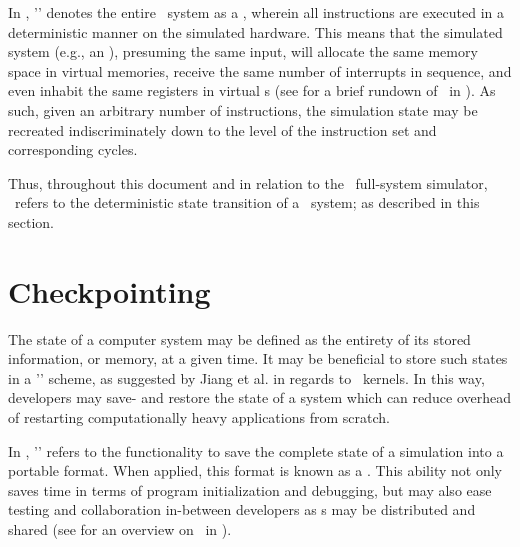 In \dvttermsimics , '\dvttermdeterministicexecution ' denotes the entire \dvttermtarget\ system as a \dvttermdeterministicalgorithm , wherein all instructions are executed in a deterministic manner on the simulated hardware.
This means that the simulated system (e.g., an \dvttermos ), presuming the same input, will allocate the same memory space in virtual memories, receive the same number of interrupts in sequence, and even inhabit the same registers in virtual \dvttermcpu s (see  for a brief rundown of \dvttermdeterministicexecution\ in \dvttermsimics ).
As such, given an arbitrary number of instructions, the simulation state may be recreated indiscriminately down to the level of the instruction set and corresponding cycles.

Thus, throughout this document and in relation to the \dvttermsimics\ full-system simulator, \dvttermdeterministicexecution\ refers to the deterministic state transition of a \dvttermtarget\ system; as described in this section.

\section{Checkpointing}
\label{sec:background_checkpointing}
The state of a computer system may be defined as the entirety of its stored information, or memory, at a given time.
It may be beneficial to store such states in a '\dvttermcheckpointrestart ' scheme, as suggested by Jiang et al. in regards to \dvttermcuda\ kernels.
In this way, developers may save- and restore the state of a system which can reduce overhead of restarting computationally heavy applications from scratch.

In \dvttermsimics , '\dvttermcheckpointing ' refers to the functionality to save the complete state of a simulation into a portable format.
When applied, this format is known as a \dvttermcheckpoint .
This ability not only  saves time in terms of program initialization and debugging, but may also ease testing and collaboration in-between developers as \dvttermcheckpoint s may be distributed and shared (see  for an overview on \dvttermcheckpointing\ in \dvttermsimics ).

